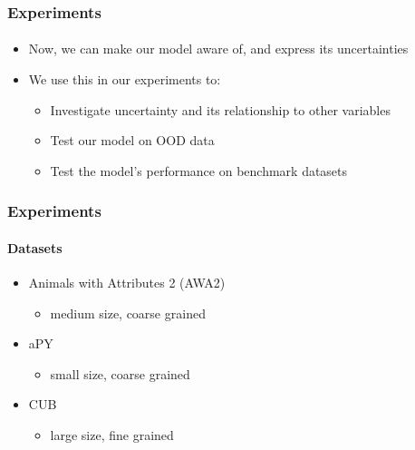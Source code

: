 \documentclass[9pt]{beamer}
\begin{document}
\begin{frame}
\frametitle{Experiments}
\framesubtitle{}
\begin{itemize}
	\item Now, we can make our model aware of, and express its uncertainties
	\item We use this in our experiments to:
	\begin{itemize}
		\item Investigate uncertainty and its relationship to other variables
		\item Test our model on OOD data
		\item Test the model's performance on benchmark datasets
	\end{itemize}
\end{itemize}
\end{frame}


\begin{frame}
\frametitle{Experiments}
\framesubtitle{Datasets}
\begin{itemize}
	\item Animals with Attributes 2 (AWA2)
	\begin{itemize}
		\item medium size, coarse grained
	\end{itemize}
	\item aPY
	\begin{itemize}
		\item small size, coarse grained
	\end{itemize}	
	\item CUB
	\begin{itemize}
		\item large size, fine grained 
	\end{itemize}
\end{itemize}
\end{frame}
\end{document}

